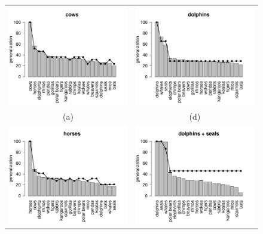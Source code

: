 \begin{figure}[p]
\begin{center}
\begin{tabular}{cc}
	\includegraphics[width=6.5cm]{generalization_figs/cows.pdf} &
	\includegraphics[width=6.5cm]{generalization_figs/dolphins.pdf} \\
	(a) & (d) \\
	\includegraphics[width=6.5cm]{generalization_figs/horses.pdf} &
	\includegraphics[width=6.5cm]{generalization_figs/dolphinsseals.pdf} \\

\end{tabular}
\end{center}
\end{figure}
